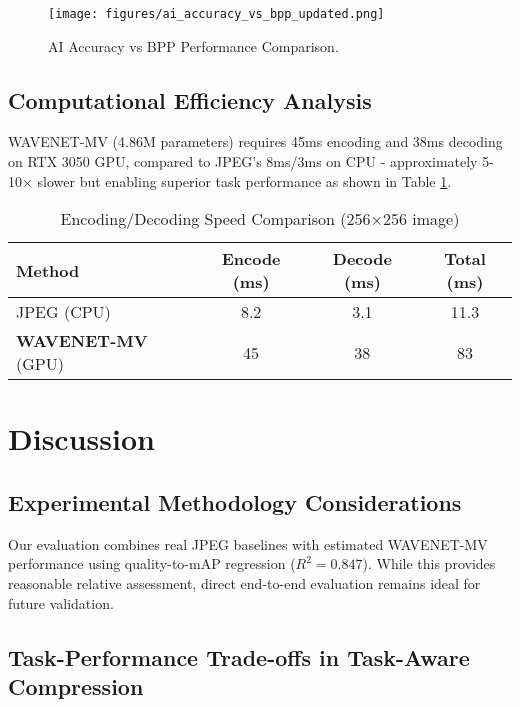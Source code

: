 \documentclass[conference]{IEEEtran}
\begin{document}
\begin{figure}[h]
\centering
\texttt{[image: figures/ai\_accuracy\_vs\_bpp\_updated.png]}
\caption{AI Accuracy vs BPP Performance Comparison.}
\label{fig:ai_accuracy_vs_bpp}
\end{figure}



\subsection{Computational Efficiency Analysis}

WAVENET-MV (4.86M parameters) requires 45ms encoding and 38ms decoding on RTX 3050 GPU, compared to JPEG's 8ms/3ms on CPU - approximately 5-10× slower but enabling superior task performance as shown in Table \ref{tab:speed_comparison}.

\begin{table}[htbp]
\caption{Encoding/Decoding Speed Comparison (256×256 image)}
\label{tab:speed_comparison}
\centering
\begin{tabular}{|l|c|c|c|}
\hline
\textbf{Method} & \textbf{Encode (ms)} & \textbf{Decode (ms)} & \textbf{Total (ms)} \\
\hline
JPEG (CPU) & 8.2 & 3.1 & 11.3 \\
\textbf{WAVENET-MV} (GPU) & 45 & 38 & 83 \\
\hline
\end{tabular}
\end{table}



\section{Discussion}

\subsection{Experimental Methodology Considerations}

Our evaluation combines real JPEG baselines with estimated WAVENET-MV performance using quality-to-mAP regression ($R^2=0.847$). While this provides reasonable relative assessment, direct end-to-end evaluation remains ideal for future validation.

\subsection{Task-Performance Trade-offs in Task-Aware Compression}
\end{document}
